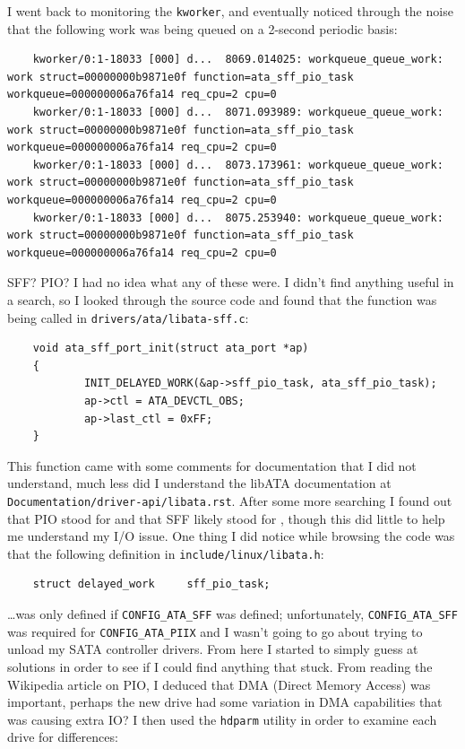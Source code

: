 \documentclass{article}
\begin{document}
I went back to monitoring the \texttt{kworker}, and eventually noticed through the noise that the following work was being queued on a 2-second periodic basis:
\begin{verbatim}
	kworker/0:1-18033 [000] d...  8069.014025: workqueue_queue_work: work struct=00000000b9871e0f function=ata_sff_pio_task workqueue=000000006a76fa14 req_cpu=2 cpu=0
	kworker/0:1-18033 [000] d...  8071.093989: workqueue_queue_work: work struct=00000000b9871e0f function=ata_sff_pio_task workqueue=000000006a76fa14 req_cpu=2 cpu=0
	kworker/0:1-18033 [000] d...  8073.173961: workqueue_queue_work: work struct=00000000b9871e0f function=ata_sff_pio_task workqueue=000000006a76fa14 req_cpu=2 cpu=0
	kworker/0:1-18033 [000] d...  8075.253940: workqueue_queue_work: work struct=00000000b9871e0f function=ata_sff_pio_task workqueue=000000006a76fa14 req_cpu=2 cpu=0
\end{verbatim}
SFF?  PIO?  I had no idea what any of these were.  I didn't find anything useful in a search, so I looked through the source code and found that the function was being called in \texttt{drivers/ata/libata-sff.c}:
\begin{verbatim}
	void ata_sff_port_init(struct ata_port *ap)
	{
	        INIT_DELAYED_WORK(&ap->sff_pio_task, ata_sff_pio_task);
	        ap->ctl = ATA_DEVCTL_OBS;
	        ap->last_ctl = 0xFF;
	}
\end{verbatim}
This function came with some comments for documentation that I did not understand, much less did I understand the libATA documentation at \texttt{Documentation/driver-api/libata.rst}.  After some more searching I found out that PIO stood for  and that SFF likely stood for , though this did little to help me understand my I/O issue.  One thing I did notice while browsing the code was that the following definition in \texttt{include/linux/libata.h}:
\begin{verbatim}
	struct delayed_work     sff_pio_task;
\end{verbatim}
\ldots was only defined if \texttt{CONFIG_ATA_SFF} was defined; unfortunately, \texttt{CONFIG_ATA_SFF} was required for \texttt{CONFIG_ATA_PIIX} and I wasn't going to go about trying to unload my SATA controller drivers.  From here I started to simply guess at solutions in order to see if I could find anything that stuck.  From reading the Wikipedia article on PIO, I deduced that DMA (Direct Memory Access) was important, perhaps the new drive had some variation in DMA capabilities that was causing extra IO?  I then used the \texttt{hdparm} utility in order to examine each drive for differences:
\end{document}
